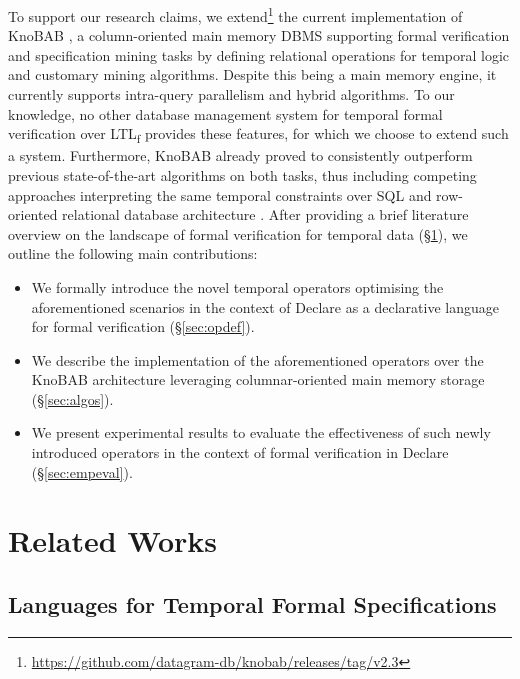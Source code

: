 \documentclass[sigconf]{acmart}
\begin{document}



To support our research claims, we extend\footnote{\url{https://github.com/datagram-db/knobab/releases/tag/v2.3}} the current implementation of KnoBAB \cite{computers12090185}, a column-oriented main memory DBMS supporting formal verification and specification mining tasks by defining relational operations for temporal logic and customary mining algorithms. Despite this being a main memory engine, it currently supports intra-query parallelism and hybrid algorithms. To our knowledge, no other database management system for temporal formal verification over LTL\textsubscript{f} provides these features, for which we choose to extend such a system. Furthermore, KnoBAB already proved to consistently outperform previous state-of-the-art algorithms on both tasks, thus including competing approaches interpreting the same temporal constraints over SQL and row-oriented relational database architecture \cite{DBLP:conf/caise/SchonigRCJM16}. After providing a brief literature overview on the landscape of formal verification for temporal data (\S\ref{sec:relwork}), we outline the following main contributions:
\begin{itemize}
\item We formally introduce the novel temporal operators optimising the aforementioned scenarios in the context of Declare as a declarative language for formal verification (\S\ref{sec:opdef}).
\item We describe the implementation of the aforementioned operators over the KnoBAB architecture leveraging columnar-oriented main memory storage (\S\ref{sec:algos}).
\item We present experimental results to evaluate the effectiveness of such newly introduced operators in the context of formal verification in Declare (\S\ref{sec:empeval}). 
\end{itemize}


\section{Related Works}\label{sec:relwork}
\subsection{Languages for Temporal Formal Specifications}\label{ssec:languages}
\end{document}
